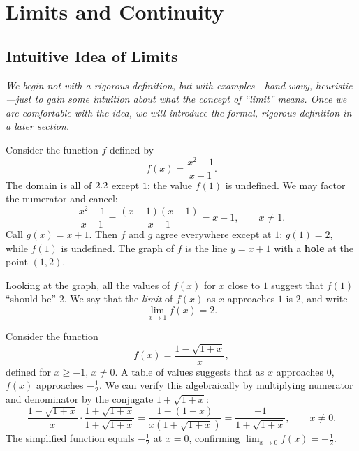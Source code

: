 \chapter{Limits and Continuity}

\section{Intuitive Idea of Limits}
\label{sec:2.1}

\textit{We begin not with a rigorous definition, but with examples---hand-wavy, heuristic---just to gain some intuition about what the concept of ``limit'' means.  Once we are comfortable with the idea, we will introduce the formal, rigorous definition in a later section.}

\begin{example}
\label{ex:2-1}
Consider the function $f$ defined by
\[
  f(x) = \dfrac{x^{2} - 1}{x - 1}.
\]
The domain is all of $2.2$ except $1$; the value $f(1)$ is undefined.  We may factor the numerator and cancel:
\[
  \dfrac{x^{2} - 1}{x - 1} = \dfrac{(x-1)(x+1)}{x-1} = x + 1, \qquad x \neq 1.
\]
Call $g(x) = x + 1$.  Then $f$ and $g$ agree everywhere except at $1$: $g(1) = 2$, while $f(1)$ is undefined.  The graph of $f$ is the line $y = x + 1$ with a \textbf{hole} at the point $(1, 2)$.

Looking at the graph, all the values of $f(x)$ for $x$ close to $1$ suggest that $f(1)$ ``should be'' $2$.  We say that the \emph{limit} of $f(x)$ as $x$ approaches $1$ is $2$, and write
\[
  \lim_{x \to 1} f(x) = 2.
\]
\end{example}

\begin{example}
\label{ex:2-2}
Consider the function
\[
  f(x) = \dfrac{1 - \sqrt{1 + x}}{x},
\]
defined for $x \geq -1$, $x \neq 0$.  A table of values suggests that as $x$ approaches $0$, $f(x)$ approaches $-\frac{1}{2}$.  We can verify this algebraically by multiplying numerator and denominator by the conjugate $1 + \sqrt{1+x}$:
\[
  \dfrac{1 - \sqrt{1+x}}{x} \cdot \dfrac{1 + \sqrt{1+x}}{1 + \sqrt{1+x}}
  = \dfrac{1 - (1+x)}{x\!\left(1 + \sqrt{1+x}\right)}
  = \dfrac{-1}{1 + \sqrt{1+x}}, \qquad x \neq 0.
\]
The simplified function equals $-\frac{1}{2}$ at $x = 0$, confirming $\lim_{x \to 0} f(x) = -\frac{1}{2}$.
\end{example}

